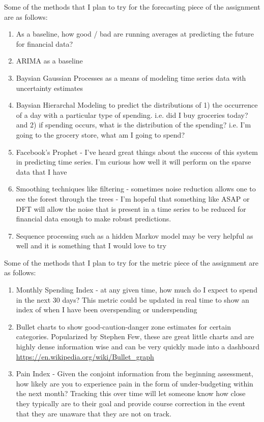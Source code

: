 \documentclass[11pt,a4paper]{article}
\begin{document}
Some of the methods that I plan to try for the forecasting piece of the assignment are as follows:
\begin{enumerate}
	\item As a baseline, how good / bad are running averages at predicting the future for financial data?
	\item ARIMA as a baseline
	\item Baysian Gaussian Processes as a means of modeling time series data with uncertainty estimates
	\item Baysian Hierarchal Modeling to predict the distributions of 1) the occurrence of a day with a particular type of spending. i.e. did I buy groceries today? and 2) if spending occurs, what is the distribution of the spending? i.e. I'm going to the grocery store, what am I going to spend?
	\item Facebook's Prophet - I've heard great things about the success of this system in predicting time series. I'm curious how well it will perform on the sparse data that I have
	\item Smoothing techniques like filtering - sometimes noise reduction allows one to see the forest through the trees - I'm hopeful that something like ASAP or DFT will allow the noise that is present in a time series to be reduced for financial data enough to make robust predictions. 
	\item Sequence processing such as a hidden Markov model may be very helpful as well and it is something that I would love to try
\end{enumerate}


Some of the methods that I plan to try for the metric piece of the assignment are as follows:
\begin{enumerate}
	\item Monthly Spending Index - at any given time, how much do I expect to spend in the next 30 days? This metric could be updated in real time to show an index of when I have been overspending or underspending
	\item Bullet charts to show good-caution-danger zone estimates for certain categories. Popularized by Stephen Few, these are great little charts and are highly dense information wise and can be very quickly made into a dashboard {\color{blue} \url{https://en.wikipedia.org/wiki/Bullet_graph}}
	\item Pain Index - Given the conjoint information from the beginning assessment, how likely are you to experience pain in the form of under-budgeting within the next month? Tracking this over time will let someone know how close they typically are to their goal and provide course correction in the event that they are unaware that they are not on track. 
\end{enumerate}
\end{document}
